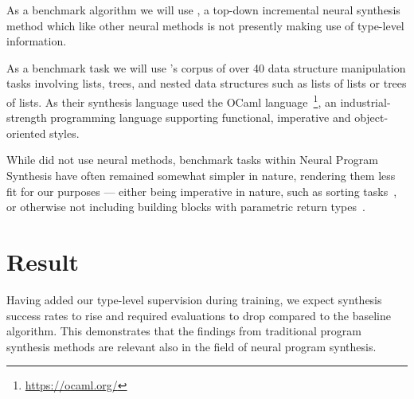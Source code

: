 \documentclass{article}
\begin{document}

As a benchmark algorithm we will use \cite{nsps}, a top-down incremental neural synthesis method which like other neural methods is not presently making use of type-level information.


As a benchmark task we will use \cite{feser2015synthesizing}'s corpus of over 40 data structure manipulation tasks involving lists, trees, and nested data structures such as lists of lists or trees of lists.
As their synthesis language \cite{feser2015synthesizing} used the OCaml language~\footnote{\url{https://ocaml.org/}}, an industrial-strength programming language supporting functional, imperative and object-oriented styles.

While \cite{feser2015synthesizing} did not use neural methods, benchmark tasks within Neural Program Synthesis have often remained somewhat simpler in nature, rendering them less fit for our purposes --- either being imperative in nature, such as sorting tasks~\citep{reed2015neural}, or otherwise not including building blocks with parametric return types~\citep{nsps}.



\section{Result}

Having added our type-level supervision during training, we expect synthesis success rates to rise and required evaluations to drop compared to the baseline algorithm. This demonstrates that the findings from traditional program synthesis methods are relevant also in the field of neural program synthesis.




\end{document}
